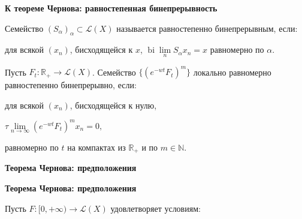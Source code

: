 \documentclass[11pt]{article}
\newcommand{\R}{\mathbb{R}}
\newcommand{\N}{\mathbb{N}}
\begin{document}
\newpage

\begin{center}
{\color{notaeYELLOW}\bfseries\fontsize{44}{52}\selectfont К теореме Чернова: равностепенная бинепрерывность}
\end{center}
\vspace*{\fill}
\begin{center}
\fontsize{36}{43}\selectfont
\parbox{\linewidth}{\centering\noindent Семейство $(S_\alpha)_\alpha\subset\mathcal{L}(X)$ называется равностепенно бинепрерывным, если:
\par}\vspace{0.4in}
\parbox{\linewidth}{\centering\noindent для всякой $(x_n)$, бисходящейся к $x$, $\operatorname{bi}\lim\limits_n S_\alpha x_n=x$ равномерно по $\alpha$.
\par}\vspace{0.4in}
\parbox{\linewidth}{\centering\noindent Пусть $F_t:\R_+\to\mathcal{L}(X)$. Семейство $\{(e^{-wt}F_t)^m\}$ локально равномерно равностепенно бинепрерывно, если:
\par}\vspace{0.4in}
\parbox{\linewidth}{\centering\noindent для всякой $(x_n)$, бисходящейся к нулю,
\par}\vspace{0.4in}
\parbox{\linewidth}{\centering\noindent $\tau\lim\limits_{n\to\infty}(e^{-wt}F_t)^m x_n=0,$
\par}\vspace{0.4in}
\parbox{\linewidth}{\centering\noindent равномерно по $t$ на компактах из $\R_+$ и по $m\in\N$.
\par}\vspace{0.4in}
\end{center}
\vspace*{\fill}

\newpage

\begin{center}
{\color{notaeYELLOW}\bfseries\fontsize{44}{52}\selectfont Теорема Чернова: предположения}
\end{center}
\vspace*{\fill}
\begin{center}
\fontsize{36}{43}\selectfont
\end{center}
\vspace*{\fill}

\newpage

\begin{center}
{\color{notaeYELLOW}\bfseries\fontsize{44}{52}\selectfont Теорема Чернова: предположения}
\end{center}
\vspace*{\fill}
\begin{center}
\fontsize{36}{43}\selectfont
\parbox{\linewidth}{\centering\noindent Пусть $F:[0,+\infty)\to\mathcal{L}(X)$ удовлетворяет условиям:
\par}\vspace{0.4in}
\end{center}
\vspace*{\fill}
\end{document}
